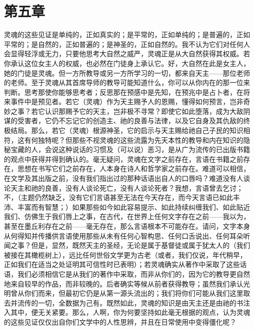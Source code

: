 
\section{第五章}

灵魂的这些见证是单纯的，正如真实的；是平常的，正如单纯的；是普遍的，正如平常的；是自然的，正如普遍的；是神圣的，正如自然的。我不认为它们对任何人会显得轻浮或无力，只要他思考大自然之威严，灵魂正是从大自然获得其权威。若你承认这位女主人的权威，也必然在门徒身上承认它。好，大自然在此是女主人，她的门徒是灵魂。但一方所教导或另一方所学习的一切，都来自天主——那位老师的老师。至于灵魂从其首席导师的教导可能知道什么，你可以从你内在的那一位来判断。思考那使你能够思考者；反思那在预感中是先知，在预兆中是占卜者，在将来事件中是预见者。若它（灵魂）作为天主赐予人的恩赐，懂得如何预言，岂非奇妙之事？若它认识那赐予它的天主，岂非极不寻常？即使它如此堕落，成为大敌阴谋的受害者，它仍不忘记它的创造主、祂的良善与法律，以及它自身及其仇敌的终极结局。那么，若它（灵魂）根源神圣，它的启示与天主赐给祂自己子民的知识相符，这有何独特呢？但那些不视灵魂的这些流露为先天本性的教导和内在知识的隐秘宝藏的人，会说这种说话的习惯及（可以说）恶习，是从广为流传的已出版书籍的观点中获得并得到确认的。毫无疑问，灵魂在文字之前存在，言语在书籍之前存在，思想在书写它们之前存在，人本身在诗人和哲学家之前存在。难道可以相信，在文学及其出版之前，没有我们指出过的那种话语出自人的口唇吗？难道没有人谈论天主和祂的良善，没有人谈论死亡，没有人谈论死者？我想，言语曾去乞讨；不，（主题仍然缺乏，没有它们言语甚至无法在今天存在，而今天言语已如此丰沛、丰富而有智慧；）如果那些如今如此容易提示、如此持续纠缠我们、如此贴近我们、仿佛生于我们唇上之事，在古代，在世界上任何文字存在之前——我以为，甚至在墨丘利存在之前——毫无存在，那么言语根本不可能存在。请问，文字本身从何得知并传播供言语使用那些从未有任何心智构思、任何口舌说出、任何耳朵听闻之事？但是，显然，既然天主的圣经，无论是属于基督徒或属于犹太人的（我们被接在其橄榄树上），远比任何世俗文学更为古老（或者，我们仅说，年代稍早，正如我们在适当之处证明其可信性时已表明）；若灵魂确实从著作中采取了这些话语，我们必须相信它是从我们的著作中采取，而非从你们的，因为它的教导更自然地来自较早的作品，而非较晚的。后者确实等候从前者获得教导；虽然我们承认光明曾从你们而来，但最初它仍是从第一源头流出的；我们将你们可能从我们这里取去并流传的一切，全数据为己有。既然如此，灵魂的知识是由天主还是由祂的书注入其中，便无关紧要。那么，人啊，你为何要坚持如此毫无根据的观点，认为灵魂的这些见证仅仅出自你们文学中的人性思辨，并且在日常使用中变得僵化呢？\par

